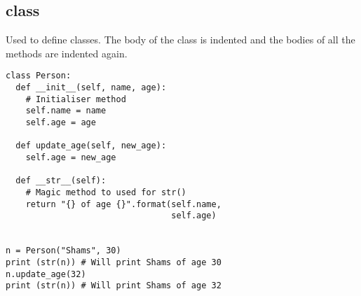 \subsection{class}
Used to define classes. The body of the class is indented and the
bodies of all the methods are indented again.

\begin{lstlisting}
class Person:
  def __init__(self, name, age):
    # Initialiser method
    self.name = name
    self.age = age

  def update_age(self, new_age):
    self.age = new_age

  def __str__(self):
    # Magic method to used for str()
    return "{} of age {}".format(self.name,
                                 self.age)


n = Person("Shams", 30)
print (str(n)) # Will print Shams of age 30
n.update_age(32)
print (str(n)) # Will print Shams of age 32
\end{lstlisting}
